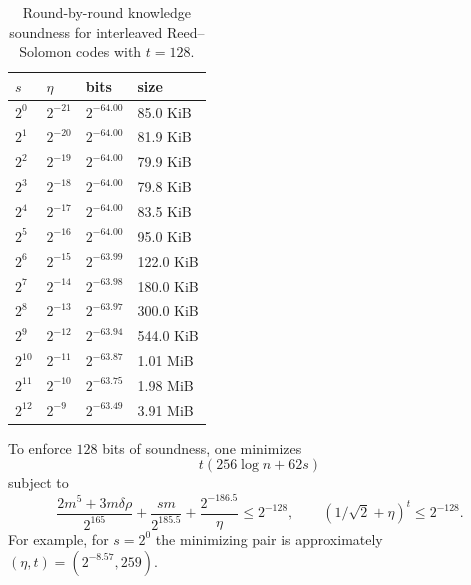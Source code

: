 \documentclass[11pt]{article}
\theoremstyle{plain}
\theoremstyle{definition}
\begin{document}
\begin{table}[htbp]
\centering
\begin{tabular}{llll}
\toprule
$s$ & $\eta$ & bits & size \\
\midrule
$2^0$ & $2^{-21}$ & $2^{-64.00}$ & 85.0 KiB \\
$2^1$ & $2^{-20}$ & $2^{-64.00}$ & 81.9 KiB \\
$2^2$ & $2^{-19}$ & $2^{-64.00}$ & 79.9 KiB \\
$2^3$ & $2^{-18}$ & $2^{-64.00}$ & 79.8 KiB \\
$2^4$ & $2^{-17}$ & $2^{-64.00}$ & 83.5 KiB \\
$2^5$ & $2^{-16}$ & $2^{-64.00}$ & 95.0 KiB \\
$2^6$ & $2^{-15}$ & $2^{-63.99}$ & 122.0 KiB \\
$2^7$ & $2^{-14}$ & $2^{-63.98}$ & 180.0 KiB \\
$2^8$ & $2^{-13}$ & $2^{-63.97}$ & 300.0 KiB \\
$2^9$ & $2^{-12}$ & $2^{-63.94}$ & 544.0 KiB \\
$2^{10}$ & $2^{-11}$ & $2^{-63.87}$ & 1.01 MiB \\
$2^{11}$ & $2^{-10}$ & $2^{-63.75}$ & 1.98 MiB \\
$2^{12}$ & $2^{-9}$ & $2^{-63.49}$ & 3.91 MiB \\
\bottomrule
\end{tabular}
\caption{Round-by-round knowledge soundness for interleaved Reed--Solomon codes with $t=128$.}
\end{table}

To enforce $128$ bits of soundness, one minimizes
\[
  t(256\log n+62s)
\]
subject to
\[
\frac{2m^5+3m\delta\rho}{2^{165}}+\frac{sm}{2^{185.5}}+\frac{2^{-186.5}}{\eta}\le 2^{-128},
\qquad
(1/\sqrt2+\eta)^t\le2^{-128}.
\]
For example, for $s=2^0$ the minimizing pair is approximately $(\eta,t)=(2^{-8.57},259)$.
\end{document}

